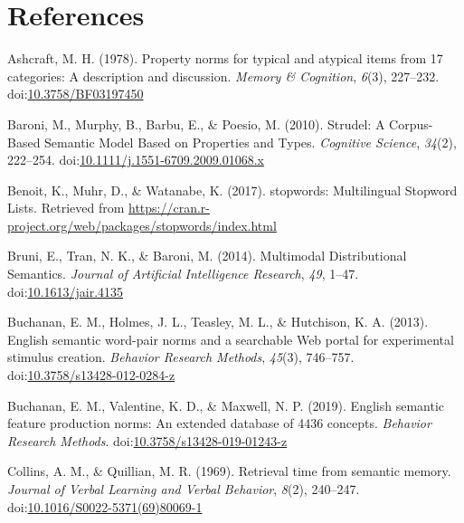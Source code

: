 \documentclass[man]{apa6}
\begin{document}
\newpage

\hypertarget{references}{%
\section{References}\label{references}}

\begingroup
\setlength{\parindent}{-0.5in}
\setlength{\leftskip}{0.5in}

\hypertarget{refs}{}
\leavevmode\hypertarget{ref-Ashcraft1978a}{}%
Ashcraft, M. H. (1978). Property norms for typical and atypical items from 17 categories: A description and discussion. \emph{Memory \& Cognition}, \emph{6}(3), 227--232. doi:\href{https://doi.org/10.3758/BF03197450}{10.3758/BF03197450}

\leavevmode\hypertarget{ref-Baroni2010}{}%
Baroni, M., Murphy, B., Barbu, E., \& Poesio, M. (2010). Strudel: A Corpus-Based Semantic Model Based on Properties and Types. \emph{Cognitive Science}, \emph{34}(2), 222--254. doi:\href{https://doi.org/10.1111/j.1551-6709.2009.01068.x}{10.1111/j.1551-6709.2009.01068.x}

\leavevmode\hypertarget{ref-Benoit2017}{}%
Benoit, K., Muhr, D., \& Watanabe, K. (2017). stopwords: Multilingual Stopword Lists. Retrieved from \url{https://cran.r-project.org/web/packages/stopwords/index.html}

\leavevmode\hypertarget{ref-Bruni2014}{}%
Bruni, E., Tran, N. K., \& Baroni, M. (2014). Multimodal Distributional Semantics. \emph{Journal of Artificial Intelligence Research}, \emph{49}, 1--47. doi:\href{https://doi.org/10.1613/jair.4135}{10.1613/jair.4135}

\leavevmode\hypertarget{ref-Buchanan2013}{}%
Buchanan, E. M., Holmes, J. L., Teasley, M. L., \& Hutchison, K. A. (2013). English semantic word-pair norms and a searchable Web portal for experimental stimulus creation. \emph{Behavior Research Methods}, \emph{45}(3), 746--757. doi:\href{https://doi.org/10.3758/s13428-012-0284-z}{10.3758/s13428-012-0284-z}

\leavevmode\hypertarget{ref-Buchanan2019}{}%
Buchanan, E. M., Valentine, K. D., \& Maxwell, N. P. (2019). English semantic feature production norms: An extended database of 4436 concepts. \emph{Behavior Research Methods}. doi:\href{https://doi.org/10.3758/s13428-019-01243-z}{10.3758/s13428-019-01243-z}

\leavevmode\hypertarget{ref-Collins1969}{}%
Collins, A. M., \& Quillian, M. R. (1969). Retrieval time from semantic memory. \emph{Journal of Verbal Learning and Verbal Behavior}, \emph{8}(2), 240--247. doi:\href{https://doi.org/10.1016/S0022-5371(69)80069-1}{10.1016/S0022-5371(69)80069-1}
\end{document}
